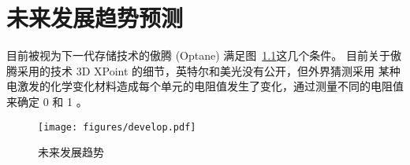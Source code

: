 \documentclass[../main]{subfiles}
\begin{document}
\chapter{未来发展趋势预测}%
\label{cha:prediction}

目前被视为下一代存储技术的傲腾 (Optane) 满足图~\ref{fig:develop}这几个条件。
目前关于傲腾采用的技术 3D XPoint 的细节，英特尔和美光没有公开，但外界猜测采用
某种电激发的化学变化材料造成每个单元的电阻值发生了变化，通过测量不同的电阻值
来确定 0 和 1 。

\begin{figure}[htbp]
  \centering
  \texttt{[image: figures/develop.pdf]}
  \caption{未来发展趋势}%
  \label{fig:develop}
\end{figure}
\end{document}
